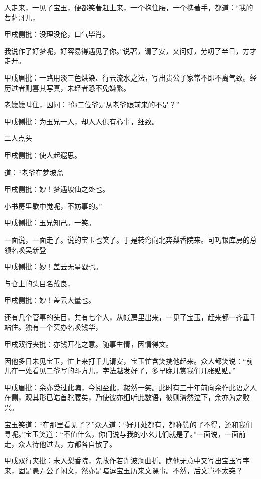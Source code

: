 \begin{parag}
人走来，一见了宝玉，便都笑著赶上来，一个抱住腰，一个携著手，都道：“我的菩萨哥儿，\begin{note}甲戌侧批：没理没伦，口气毕肖。\end{note}我说作了好梦呢，好容易得遇见了你。”说著，请了安，又问好，劳叨了半日，方才走开。\begin{note}甲戌眉批：一路用淡三色烘染、行云流水之法，写出贵公子家常不即不离气致。经历过者则喜其写真，未经者恐不免嫌繁。\end{note}老嬷嬷叫住，因问：“你二位爷是从老爷跟前来的不是？”\begin{note}甲戌侧批：为玉兄一人，却人人俱有心事，细致。\end{note}二人点头\begin{note}甲戌侧批：使人起遐思。\end{note}道：“老爷在梦坡斋\begin{note}甲戌侧批：妙！梦遇坡仙之处也。\end{note}小书房里歇中觉呢，不妨事的。”\begin{note}甲戌侧批：玉兄知己。一笑。\end{note}一面说，一面走了。说的宝玉也笑了。于是转弯向北奔梨香院来。可巧银库房的总领名唤吴新登\begin{note}甲戌侧批：妙！盖云无星戥也。\end{note}与仓上的头目名戴良，\begin{note}甲戌侧批：妙！盖云大量也。\end{note}还有几个管事的头目，共有七个人，从帐房里出来，一见了宝玉，赶来都一齐垂手站住。独有一个买办名唤钱华，\begin{note}甲戌双行夹批：亦钱开花之意。随事生情，因情得文。\end{note}因他多日未见宝玉，忙上来打千儿请安，宝玉忙含笑携他起来。众人都笑说：“前儿在一处看见二爷写的斗方儿，字法越发好了，多早晚儿赏我们几张贴贴。”\begin{note}甲戌眉批：余亦受过此骗，今阅至此，赧然一笑。此时有三十年前向余作此语之人在侧，观其形已皓首驼腰矣，乃使彼亦细听此数语，彼则潸然泣下，余亦为之败兴。\end{note}宝玉笑道：“在那里看见了？”众人道：“好几处都有，都称赞的了不得，还和我们寻呢。”宝玉笑道：“不值什么，你们说与我的小幺儿们就是了。”一面说，一面前走，众人待他过去，方都各自散了。\begin{note}甲戌双行夹批：未入梨香院，先故作若许波澜曲折。瞧他无意中又写出宝玉写字来，固是愚弄公子闲文，然亦是暗逗宝玉历来文课事。不然，后文岂不太突？\end{note}
\end{parag}


